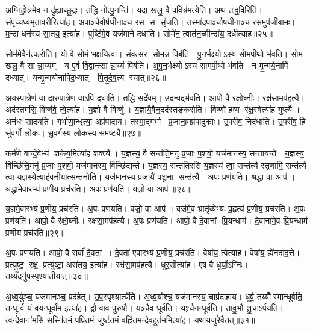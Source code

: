 अ॒ग्नि॒हो॒त्रमे॒व न दु॑ह्याच्छू॒द्रः। तद्धि नोत्पु॒नन्ति॑। य॒दा खलु॒ वै प॒वित्र॑म॒त्येति॑। अथ॒ तद्ध॒विरिति॑। संपृ॑च्यध्वमृतावरी॒रित्या॑ह। अ॒पाञ्चै॒वौष॑धीनाञ्च॒ रस॒ स सृ॑जति। तस्मा॑द॒पाञ्चौष॑धीनाञ्च॒ रस॒मुप॑जीवामः। म॒न्द्रा धन॑स्य सा॒तय॒ इत्या॑ह। पुष्टि॑मे॒व यज॑माने दधाति। सोमे॑न॒ त्वात॑न॒च्मीन्द्रा॑य॒ दधीत्या॑ह॥२५॥

सोम॑मे॒वैन॑त्करोति। यो वै सोमं॑ भक्षयि॒त्वा। सं॒व॒त्स॒र सोम॒न्न पिब॑ति। पु॒न॒र्भक्ष्योऽस्य सोमपी॒थो भ॑वति। सोम॒ खलु॒ वै सान्ना॒य्यम्। य ए॒वं वि॒द्वान्त्सान्ना॒य्यं पिब॑ति। अ॒पु॒न॒र्भक्ष्योऽस्य सामपी॒थो भ॑वति। न मृ॒न्मये॒नापि॑ दध्यात्। यन्मृ॒न्मयो॑नापिद॒ध्यात्। पि॒तृ॒दे॒व॒त्य स्यात्॥२६॥

अ॒य॒स्पा॒त्रेण॑ वा दारुपा॒त्रेण॒ वाऽपि॑ दधाति। तद्धि सदे॑वम्। उ॒द॒न्वद्भ॑वति। आपो॒ वै र॑क्षो॒घ्नीः। रक्ष॑सा॒मप॑हत्यै। अद॑स्तमसि॒ विष्ण॑वे॒ त्वे॒त्या॑ह। य॒ज्ञो वै विष्णु॑। य॒ज्ञायै॒वैन॒दद॑स्तङ्करोति। विष्णो॑ ह॒व्य र॑क्ष॒स्वेत्या॑ह॒ गुप्त्यै। अन॑धः सादयति। गर्भा॑णा॒न्धृत्या॒ अप्र॑पादाय। तस्मा॒द्गर्भा प्र॒जाना॒मप्र॑पादुकाः। उ॒परी॑व॒ निद॑धाति। उ॒परी॑व॒ हि सु॑व॒र्गो लो॒कः। सु॒व॒र्गस्य॑ लो॒कस्य॒ सम॑ष्ट्यै॥२७॥

कर्म॑णे वान्दे॒वेभ्य॑ शकेय॒मित्या॑ह॒ शक्त्यै। य॒ज्ञस्य॒ वै सन्त॑ति॒मनु॑ प्र॒जाः प॒शवो॒ यज॑मानस्य॒ सन्ता॑यन्ते। य॒ज्ञस्य॒ विच्छि॑त्ति॒मनु॑ प्र॒जाः प॒शवो॒ यज॑मानस्य॒ विच्छि॑द्यन्ते। य॒ज्ञस्य॒ सन्त॑तिरसि य॒ज्ञस्य॑ त्वा॒ सन्त॑त्यै स्तृणामि॒ सन्त॑त्यै त्वा य॒ज्ञस्येत्याह॑व॒नीया॒त्सन्त॑नोति। यज॑मानस्य प्र॒जायै॑ पशू॒ना सन्त॑त्यै। अ॒पः प्रण॑यति। श्र॒द्धा वा आप॑। श्र॒द्धामे॒वारभ्य॑ प्र॒णीय॒ प्रच॑रति। अ॒पः प्रण॑यति। य॒ज्ञो वा आप॑॥२८॥

य॒ज्ञमे॒वारभ्य॑ प्र॒णीय॒ प्रच॑रति। अ॒पः प्रण॑यति। वज्रो॒ वा आप॑। वज्र॑मे॒व भ्रातृ॑व्येभ्यः प्र॒हृत्य॑ प्र॒णीय॒ प्रच॑रति। अ॒पः प्रण॑यति। आपो॒ वै र॑क्षो॒घ्नीः। रक्ष॑सा॒मप॑हत्यै। अ॒पः प्रण॑यति। आपो॒ वै दे॒वानां प्रि॒यन्धाम॑। दे॒वाना॑मे॒व प्रि॒यन्धाम॑ प्र॒णीय॒ प्रच॑रति॥२९॥

अ॒पः प्रण॑यति। आपो॒ वै सर्वा॑ दे॒वता। दे॒वता॑ ए॒वारभ्य॑ प्र॒णीय॒ प्रच॑रति। वेषा॑य॒ त्वेत्या॑ह। वेषा॑य॒ ह्ये॑नदाद॒त्ते। प्रत्यु॑ष्ट॒ रक्ष॒ प्रत्यु॑ष्टा॒ अरा॑तय॒ इत्या॑ह। रक्ष॑सा॒मप॑हत्यै। धूर॒सीत्या॑ह। ए॒ष वै धुर्यो॒ऽग्निः। तय्यँदनु॑पस्पृश्याती॒यात्॥३०॥

अ॒ध्व॒र्युञ्च॒ यज॑मानञ्च॒ प्रद॑हेत्। उ॒प॒स्पृश्यात्ये॑ति। अ॒ध्व॒र्योश्च॒ यज॑मानस्य॒ चाप्र॑दाहाय। धूर्व॒ तय्योँस्मान्धूर्व॑ति॒ तन्धूर्व॒ यं व॒यन्धूर्वा॑म॒ इत्या॑ह। द्वौ वाव पुरु॑षौ। यञ्चै॒व धूर्व॑ति। यश़्चै॑न॒न्धूर्व॑ति। तावु॒भौ शु॒चाऽर्प॑यति। त्वन्दे॒वाना॑मसि॒ सस्नि॑तमं॒ पप्रि॑तमं॒ जुष्ट॑तमं॒ वह्नि॑तमन्देव॒हूत॑म॒मित्या॑ह। य॒था॒य॒जुरे॒वैतत्॥३१॥

